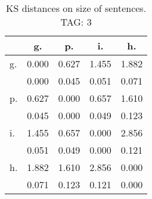 \begin{table}[h!]
\begin{center}
\begin{tabular}{| l | c | c | c | c |}\hline
 & g. & p. & i. & h. \\\hline
g. & 0.000  & 0.627  & 1.455  & 1.882 \\\hline
 & 0.000  & 0.045  & 0.051  & 0.071 \\\hline
p. & 0.627  & 0.000  & 0.657  & 1.610 \\\hline
 & 0.045  & 0.000  & 0.049  & 0.123 \\\hline
i. & 1.455  & 0.657  & 0.000  & 2.856 \\\hline
 & 0.051  & 0.049  & 0.000  & 0.121 \\\hline
h. & 1.882  & 1.610  & 2.856  & 0.000 \\\hline
 & 0.071  & 0.123  & 0.121  & 0.000 \\\hline
\end{tabular}
\caption{KS distances on size of sentences. TAG: 3}
\end{center}
\end{table}